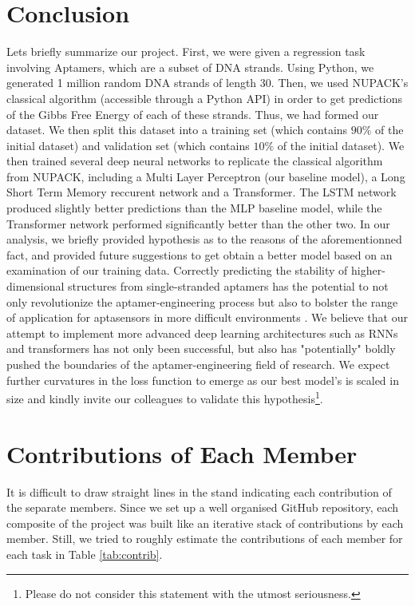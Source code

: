 \documentclass[11pt]{article}
\begin{document}
\section{Conclusion}
Lets briefly summarize our project. First, we were given a regression task involving Aptamers, which are a subset of DNA strands. Using Python, we generated 1 million random DNA strands of length $30$. Then, we used NUPACK's classical algorithm (accessible through a Python API) in order to get predictions of the Gibbs Free Energy of each of these strands. Thus, we had formed our dataset. We then split this dataset into a training set (which contains $90\%$ of the initial dataset) and validation set (which contains $10\%$ of the initial dataset). We then trained several deep neural networks to replicate the classical algorithm from NUPACK, including a Multi Layer Perceptron (our baseline model), a Long Short Term Memory reccurent network and a Transformer. The LSTM network produced slightly better predictions than the MLP baseline model, while the Transformer network performed significantly better than the other two. In our analysis, we briefly provided hypothesis as to the reasons of the aforementionned fact, and provided future suggestions to get obtain a better model based on an examination of our training data. Correctly predicting the stability of higher-dimensional structures from single-stranded aptamers has the potential to not only revolutionize the aptamer-engineering process but also to bolster the range of application for aptasensors in more difficult environments \cite{jeddi2017three}. We believe that our attempt to implement more advanced deep learning architectures such as RNNs and transformers has not only been successful, but also has "potentially" boldly pushed the boundaries of the aptamer-engineering field of research. We expect further curvatures in the loss function to emerge as our best model's is scaled in size and kindly invite our colleagues to validate this hypothesis\footnote{Please do not consider this statement with the utmost seriousness.}.

\section{Contributions of Each Member}
It is difficult to draw straight lines in the stand indicating each contribution of the separate members. Since we set up a well organised GitHub repository, each composite of the project was built like an iterative stack of contributions by each member. Still, we tried to roughly estimate the contributions of each member for each task in Table \ref{tab:contrib}.
\end{document}
